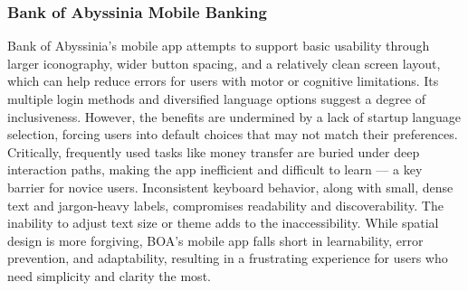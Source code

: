 \documentclass[a4paper,12pt]{report}
\begin{document}
\subsubsection{Bank of Abyssinia Mobile Banking}
Bank of Abyssinia’s mobile app attempts to support basic usability through larger iconography, wider button spacing, and a relatively clean screen layout, which can help reduce errors for users with motor or cognitive limitations. Its multiple login methods and diversified language options suggest a degree of inclusiveness. However, the benefits are undermined by a lack of startup language selection, forcing users into default choices that may not match their preferences. Critically, frequently used tasks like money transfer are buried under deep interaction paths, making the app inefficient and difficult to learn — a key barrier for novice users. Inconsistent keyboard behavior, along with small, dense text and jargon-heavy labels, compromises readability and discoverability. The inability to adjust text size or theme adds to the inaccessibility. While spatial design is more forgiving, BOA’s mobile app falls short in learnability, error prevention, and adaptability, resulting in a frustrating experience for users who need simplicity and clarity the most.
\end{document}
